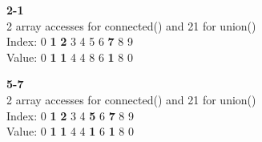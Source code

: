 \documentclass{article}
\begin{document}
\textbf{2-1}\\
2 array accesses for connected() and 21 for union()\\
Index: \hspace{4pt}0 \hspace{4pt}\textbf{1} \hspace{4pt}\textbf{2} \hspace{4pt}3 \hspace{4pt}4 \hspace{4pt}5 \hspace{4pt}6 \hspace{4pt}\textbf{7} \hspace{4pt}8 \hspace{4pt}9\\
Value: \hspace{4pt}0 \hspace{4pt}\textbf{1} \hspace{4pt}\textbf{1} \hspace{4pt}4 \hspace{4pt}4 \hspace{4pt}8 \hspace{4pt}6 \hspace{4pt}\textbf{1} \hspace{4pt}8 \hspace{4pt}0

\textbf{5-7}\\
2 array accesses for connected() and 21 for union()\\
Index: \hspace{4pt}0 \hspace{4pt}\textbf{1} \hspace{4pt}\textbf{2} \hspace{4pt}3 \hspace{4pt}4 \hspace{4pt}\textbf{5} \hspace{4pt}6 \hspace{4pt}\textbf{7} \hspace{4pt}8 \hspace{4pt}9\\
Value: \hspace{4pt}0 \hspace{4pt}\textbf{1} \hspace{4pt}\textbf{1} \hspace{4pt}4 \hspace{4pt}4 \hspace{4pt}\textbf{1} \hspace{4pt}6 \hspace{4pt}\textbf{1} \hspace{4pt}8 \hspace{4pt}0
\end{document}
